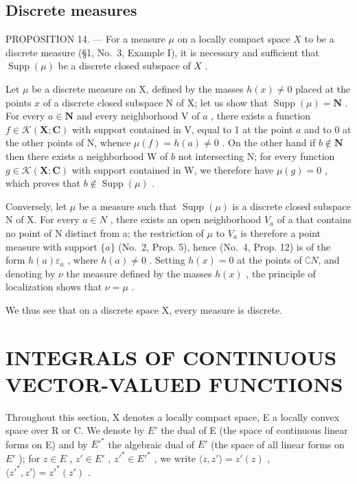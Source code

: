 \subsection{Discrete measures}

PROPOSITION 14. --- For a measure \(\mu\) on a locally compact space \(X\) to be a discrete measure (§1, No.~3, Example I), it is necessary and sufficient that \(\operatorname{Supp}(\mu)\) be a discrete closed subspace of \(X\) .

Let \(\mu\) be a discrete measure on X, defined by the masses \(h(x) \neq 0\) placed at the points \(x\) of a discrete closed subspace N of X; let us show that \(\operatorname{Supp}(\mu) = \mathbf{N}\) . For every \(a \in \mathbf{N}\) and every neighborhood V of \(a\) , there exists a function \(f \in \mathcal{K}(\mathbf{X}; \mathbf{C})\) with support contained in V, equal to 1 at the point \(a\) and to 0 at the other points of N, whence \(\mu(f) = h(a) \neq 0\) . On the other hand if \(b \notin \mathbf{N}\) then there exists a neighborhood W of \(b\) not intersecting N; for every function \(g \in \mathcal{K}(\mathbf{X}; \mathbf{C})\) with support contained in W, we therefore have \(\mu(g) = 0\) , which proves that \(b \notin \operatorname{Supp}(\mu)\) .

Conversely, let \(\mu\) be a measure such that \(\operatorname{Supp}(\mu)\) is a discrete closed subspace N of X. For every \(a \in N\) , there exists an open neighborhood \(V_{a}\) of a that contains no point of N distinct from a; the restriction of \(\mu\) to \(V_{a}\) is therefore a point measure with support \(\{a\}\) (No.~2, Prop. 5), hence (No.~4, Prop. 12) is of the form \(h(a)\varepsilon_{a}\) , where \(h(a)\neq0\) . Setting \(h(x)=0\) at the points of \(\complement N\), and denoting by \(\nu\) the measure defined by the masses \(h(x)\) , the principle of localization shows that \(\nu=\mu\) .

We thus see that on a discrete space X, every measure is discrete.

\section{INTEGRALS OF CONTINUOUS VECTOR-VALUED FUNCTIONS}

Throughout this section, X denotes a locally compact space, E a locally convex space over R or C. We denote by \(E'\) the dual of E (the space of continuous linear forms on E) and by \(E'^{*}\) the algebraic dual of \(E'\) (the space of all linear forms on \(E'\) ); for \(z \in E\) , \(z' \in E'\) , \(z'^{*} \in E'^{*}\) , we write \(\langle z, z' \rangle = z'(z)\) , \(\langle z'^{*}, z' \rangle = z'^{*}(z')\) .

